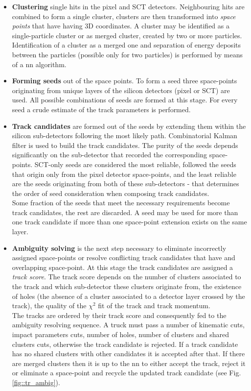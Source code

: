   	\begin{itemize}
  		\item \textbf{Clustering} single hits in the pixel and SCT detectors. Neighbouring hits are combined to form a single cluster, clusters are then transformed into \textit{space points} that have having 3D coordinates. A cluster may be identified as a single-particle cluster or as merged cluster, created by two or more particles. Identification of a cluster as a merged one and separation of energy deposits between the particles (possible only for two particles) is performed by means of a \gls{nn} algorithm. 
  		\item \textbf{Forming seeds} out of the space points. To form a seed three space-points originating from unique layers of the silicon detectors (pixel or SCT) are used. All possible combinations of seeds are formed at this stage. For every seed a crude estimate of the track parameters is performed. 
  		\item \textbf{Track candidates} are formed out of the seeds by extending them within the silicon sub-detectors following the most likely path. Combinatorial Kalman filter \cite{Fruhwirth:1987fm} is used to build the track candidates. The purity of the seeds depends significantly on the sub-detector that recorded the corresponding space-points. SCT-only seeds are considered the most reliable, followed the seeds that origin only from the pixel detector space-points, and the least reliable are the seeds originating from both of these sub-detectors -  that determines the order of seed consideration when composing track candidates. \\Some fraction of the seeds that meet the necessary requirements become track candidates, the rest are discarded. A seed may be used for more than one track candidate if more than one space-point extension exists on the same layer.
  		\item \textbf{Ambiguity solving} is the next step necessary to eliminate incorrectly assigned space-points or resolve conflicting track candidates that have and overlapping space-point. At this stage the track candidates are assigned a \textit{track score}. The track score depends on the number of clusters associated to the track and which sub-detector these clusters originate from, the existence of holes (the absence of a cluster associated to a detector layer crossed by the track), the quality of the $\chi^2$ fit of the track and track momentum.\\
  		The tracks are ordered by their track score and consequently fed to the ambiguity resolving sequence. A truck must pass a number of kinematic cuts, impact parameters cuts, number of holes, number of clusters and shared clusters cuts, otherwise the track candidate is rejected. If a track candidate has no shared clusters with other candidates it is accepted after that. If there are merged clusters then it is up to the \gls{nn} to either accept the track, reject it or eliminate a space-point and recycle the updated track candidate (see Fig. \ref{fig::tr_ambig}). 

\end{itemize}
